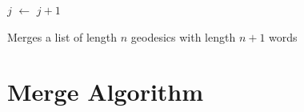 \begin{algorithm}[h!]
{{{				$j$ $\gets$ $j+1$\;
			}
		}
		
		\BlankLine
		
		
		
		\BlankLine
		
		
		\BlankLine
		
		\;
		
	}
	
	\caption{Merges a list of length $n$ geodesics with length $n+1$ words}
	\label{alg:mergesort:finalmerge}
\end{algorithm}

\newpage
\section{Merge Algorithm}
\label{apx:modified-mergesort:merge}

